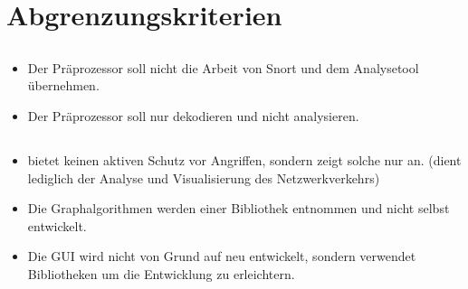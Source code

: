 \section{Abgrenzungskriterien}

\subsection{\sppname}
\begin{itemize}
\item Der Präprozessor soll nicht die Arbeit von Snort und dem Analysetool übernehmen.

\item Der Präprozessor soll nur dekodieren und nicht analysieren.

\end{itemize}

\subsection{\programname}
\begin{itemize}

\item \programname bietet keinen aktiven Schutz vor Angriffen, sondern zeigt solche nur an. (dient lediglich der Analyse und Visualisierung des Netzwerkverkehrs)

\item Die Graphalgorithmen  werden einer Bibliothek entnommen und nicht selbst entwickelt.

\item Die GUI wird nicht von Grund auf neu entwickelt, sondern verwendet Bibliotheken um die Entwicklung zu erleichtern.

\end{itemize}
